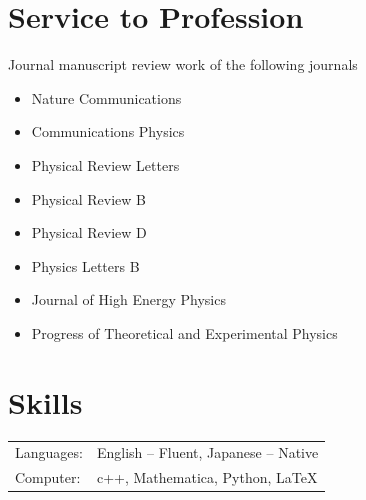 \documentclass[12pt]{article}
\begin{document}
\section*{Service to Profession}
\vspace*{1em}
Journal manuscript review work of the following journals
\begin{itemize}
  \setlength\itemsep{0em}
  \item Nature Communications
  \item Communications Physics
  \item Physical Review Letters
  \item Physical Review B
  \item Physical Review D
  \item Physics Letters B
  \item Journal of High Energy Physics
  \item Progress of Theoretical and Experimental Physics
\end{itemize}

\section*{Skills}
\begin{table}[H]
  \begin{tabular}{lp{6in}}
    Languages: & English -- Fluent, Japanese -- Native \\
    Computer: & c++, Mathematica, Python, LaTeX
  \end{tabular}
\end{table}
\end{document}
